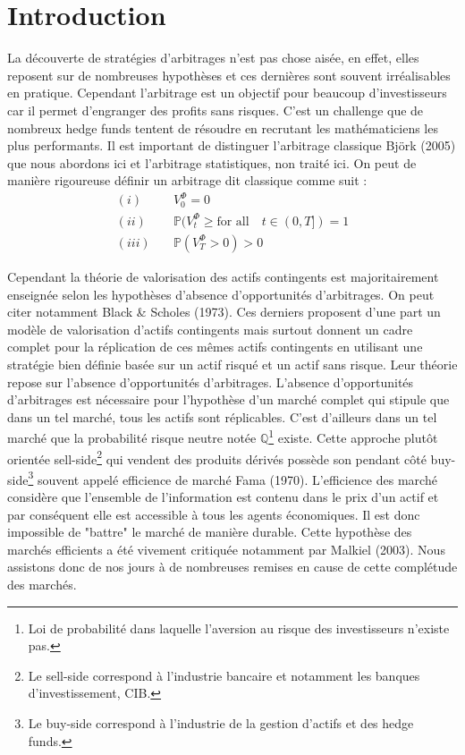 \documentclass[12pt,a4paper]{article}
\begin{document}
\section{Introduction}\label{sec:introduction}
La découverte de stratégies d'arbitrages n'est pas chose aisée, en effet, elles reposent sur de nombreuses hypothèses et ces dernières sont souvent irréalisables en pratique. Cependant l'arbitrage est un objectif pour beaucoup d'investisseurs car il permet d'engranger des profits sans risques. C'est un challenge que de nombreux hedge funds tentent de résoudre en recrutant les mathématiciens les plus performants. Il est important de distinguer l'arbitrage classique Björk (2005)\cite{bjork2005} que nous abordons ici et l'arbitrage statistiques, non traité ici. On peut de manière rigoureuse définir un arbitrage dit classique comme suit :
\begin{equation}\label{eq:arbitrage}
\begin{split}
 (i)\quad &  V_0^\Phi = 0 \\
 (ii)\quad &\mathbb{P}(V_t^\Phi \geq \text{for all}\quad t\in(0,T])=1 \\
 (iii)\quad &\mathbb{P}(V_T^\Phi>0)>0
\end{split}
\end{equation}

Cependant la théorie de valorisation des actifs contingents est majoritairement enseignée selon les hypothèses d'absence d'opportunités d'arbitrages. On peut citer notamment Black \& Scholes (1973)\cite{black1973pricing}. Ces derniers proposent d'une part un modèle de valorisation d'actifs contingents mais surtout donnent un cadre complet pour la réplication de ces mêmes actifs contingents en utilisant une stratégie bien définie basée sur un actif risqué et un actif sans risque. Leur théorie repose sur l'absence d'opportunités d'arbitrages. L'absence d'opportunités d'arbitrages est nécessaire pour l'hypothèse d'un marché complet qui stipule que dans un tel marché, tous les actifs sont réplicables. C'est d'ailleurs dans un tel marché que la probabilité risque neutre notée $\mathbb{Q}$\footnote{Loi de probabilité dans laquelle l'aversion au risque des investisseurs n'existe pas.} existe. Cette approche plutôt orientée sell-side\footnote{Le sell-side correspond à l'industrie bancaire et notamment les banques d'investissement, CIB.} qui vendent des produits dérivés possède son pendant côté buy-side\footnote{Le buy-side correspond à l'industrie de la gestion d'actifs et des hedge funds.} souvent appelé efficience de marché Fama (1970)\cite{fama1970}. L'efficience des marché considère que l'ensemble de l'information est contenu dans le prix d'un actif et par conséquent elle est accessible à tous les agents économiques. Il est donc impossible de "battre" le marché de manière durable. Cette hypothèse des marchés efficients a été vivement critiquée notamment par Malkiel (2003)\cite{malkiel2003}. Nous assistons donc de nos jours à de nombreuses remises en cause de cette complétude des marchés. 
\end{document}
